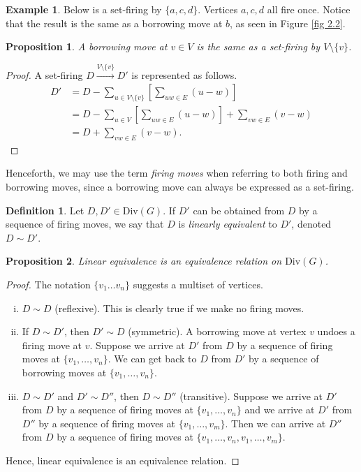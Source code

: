 \documentclass[openany, amssymb, psamsfonts]{amsart}
\newtheorem{prop}{Proposition}[section]
\theoremstyle{definition}
\newtheorem{defn}{Definition}[section]
\newtheorem{exmp}{Example}[section]
\numberwithin{equation}{section}
\begin{document}
\begin{exmp}
Below is a set-firing by $\{a,c,d\}$. Vertices $a,c,d$ all fire once. Notice that the result is the same as a borrowing move at $b$, as seen in Figure \ref{fig 2.2}.
\begin{center}
    
\end{center}
\end{exmp}

\begin{prop}
\label{prop 3.1}
A borrowing move at $v\in V$ is the same as a set-firing by $V\setminus \{v\}$.
\end{prop}
\begin{proof}
A set-firing $D\xrightarrow{V\setminus \{v\}} D'$ is represented as follows.
\begin{align*}
     D'&=D-\sum_{u\in V\setminus \{v\}}\left[\sum_{uw\in E}(u-w)\right]\\
     &=D-\sum_{u\in V}\left[\sum_{uw\in E}(u-w)\right]+\sum_{vw\in E}(v-w)\\
     &=D+\sum_{vw\in E}(v-w).
\end{align*}
\end{proof}

Henceforth, we may use the term \textit{firing moves} when referring to both firing and borrowing moves, since a borrowing move can always be expressed as a set-firing.

\begin{defn}
\label{defn 3.5}
Let $D, D'\in \text{Div}(G)$. If $D'$ can be obtained from $D$ by a sequence of firing moves, we say that $D$ is \textit{linearly equivalent} to $D'$, denoted $D\sim D'$. 
\end{defn}

\begin{prop}
Linear equivalence is an equivalence relation on $\text{Div}(G)$.
\end{prop}
\begin{proof}
The notation $\{v_1\dots v_n\}$ suggests a multiset of vertices.
\begin{enumerate}[(i)]
    \item $D\sim D$ (reflexive). This is clearly true if we make no firing moves.
    \item If $D\sim D'$, then $D'\sim D$ (symmetric). A borrowing move at vertex $v$ undoes a firing move at $v$. Suppose we arrive at $D'$ from $D$ by a sequence of firing moves at $\{v_1,\dots, v_n\}$. We can get back to $D$ from $D'$ by a sequence of borrowing moves at $\{v_1,\dots, v_n\}$.
    \item $D\sim D'$ and $D'\sim D''$, then $D\sim D''$ (transitive). Suppose we arrive at $D'$ from $D$ by a sequence of firing moves at $\{v_1,\dots, v_n\}$ and we arrive at $D'$ from $D''$ by a sequence of firing moves at $\{v_1,\dots, v_m\}$. Then we can arrive at $D''$ from $D$ by a sequence of firing moves at $\{v_1,\dots, v_n,v_1,\dots, v_m\}$.
\end{enumerate}
Hence, linear equivalence is an equivalence relation.
\end{proof}
\end{document}
